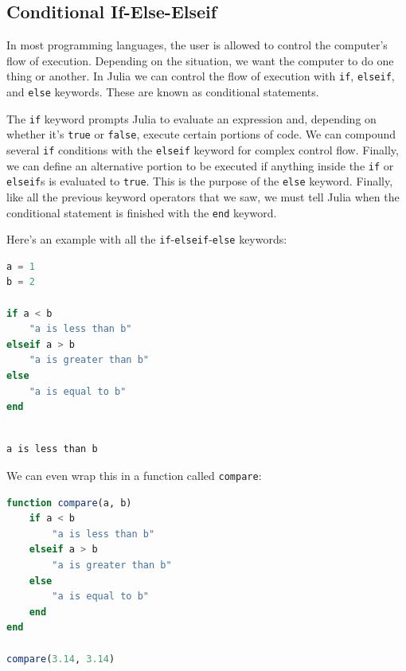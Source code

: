 \documentclass[
  notoc %
]{tufte-book}
\newcommand{\passthrough}[1]{#1}
\begin{document}
\hypertarget{sec:conditionals}{%
\subsection{Conditional If-Else-Elseif}\label{sec:conditionals}}

In most programming languages, the user is allowed to control the
computer's flow of execution. Depending on the situation, we want the
computer to do one thing or another. In Julia we can control the flow of
execution with \passthrough{\lstinline!if!},
\passthrough{\lstinline!elseif!}, and \passthrough{\lstinline!else!}
keywords. These are known as conditional statements.

The \passthrough{\lstinline!if!} keyword prompts Julia to evaluate an
expression and, depending on whether it's \passthrough{\lstinline!true!}
or \passthrough{\lstinline!false!}, execute certain portions of code. We
can compound several \passthrough{\lstinline!if!} conditions with the
\passthrough{\lstinline!elseif!} keyword for complex control flow.
Finally, we can define an alternative portion to be executed if anything
inside the \passthrough{\lstinline!if!} or
\passthrough{\lstinline!elseif!}s is evaluated to
\passthrough{\lstinline!true!}. This is the purpose of the
\passthrough{\lstinline!else!} keyword. Finally, like all the previous
keyword operators that we saw, we must tell Julia when the conditional
statement is finished with the \passthrough{\lstinline!end!} keyword.

Here's an example with all the
\passthrough{\lstinline!if!}-\passthrough{\lstinline!elseif!}-\passthrough{\lstinline!else!}
keywords:

\begin{lstlisting}[language=Julia]
a = 1
b = 2

if a < b
    "a is less than b"
elseif a > b
    "a is greater than b"
else
    "a is equal to b"
end
\end{lstlisting}

\begin{lstlisting}[language=Output]

a is less than b

\end{lstlisting}

We can even wrap this in a function called
\passthrough{\lstinline!compare!}:

\begin{lstlisting}[language=Julia]
function compare(a, b)
    if a < b
        "a is less than b"
    elseif a > b
        "a is greater than b"
    else
        "a is equal to b"
    end
end

compare(3.14, 3.14)
\end{lstlisting}
\end{document}
